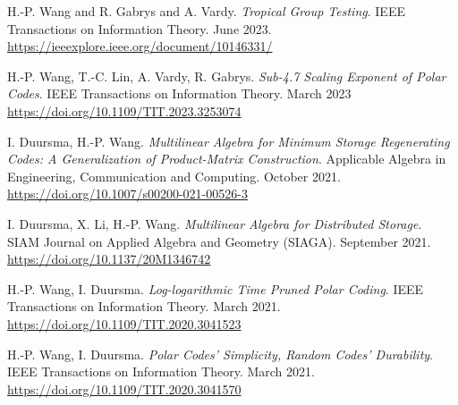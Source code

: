 \documentclass{article}
\def\sec#1{\vskip1em\textbf{\fs1#1}}
\def\fs#1{%
        \pgfmathsetmacro\a{#1}%
        \pgfmathsetmacro\A{\parskip*(4/3)^\a}%
        \pgfmathsetmacro\B{\A*(4/3)}%
        \fontsize{\A pt}{\B pt}\selectfont%
    }
\def\newtoold{\mdseries (new to old)}
\begin{document}
\bgroup
\def\section#1#2{\sec{Journal Publications \newtoold}}
\begin{thebibliography}{J9}
    H.-P. Wang and R. Gabrys and A. Vardy.
    \emph{Tropical Group Testing}.
    IEEE Transactions on Information Theory.
    June 2023.
    \url{https://ieeexplore.ieee.org/document/10146331/}

    H.-P. Wang, T.-C. Lin, A. Vardy, R. Gabrys.
    \emph{Sub-4.7 Scaling Exponent of Polar Codes}.
    IEEE Transactions on Information Theory.
    March 2023
    \url{https://doi.org/10.1109/TIT.2023.3253074}

    I. Duursma, H.-P. Wang.
    \emph{Multilinear Algebra for Minimum Storage Regenerating Codes:
        A Generalization of Product-Matrix Construction}.
    Applicable Algebra in Engineering, Communication and Computing.
    October 2021.
    \url{https://doi.org/10.1007/s00200-021-00526-3}

    I. Duursma, X. Li, H.-P. Wang.
    \emph{Multilinear Algebra for Distributed Storage}.
    SIAM Journal on Applied Algebra and Geometry (SIAGA).
    September 2021.
    \url{https://doi.org/10.1137/20M1346742}

    H.-P. Wang, I. Duursma.
    \emph{Log-logarithmic Time Pruned Polar Coding}.
    IEEE Transactions on Information Theory.
    March 2021.
    \url{https://doi.org/10.1109/TIT.2020.3041523}

    H.-P. Wang, I. Duursma.
    \emph{Polar Codes' Simplicity, Random Codes' Durability}.
    IEEE Transactions on Information Theory.
    March 2021.
    \url{https://doi.org/10.1109/TIT.2020.3041570}
\end{thebibliography}
\egroup
\end{document}
